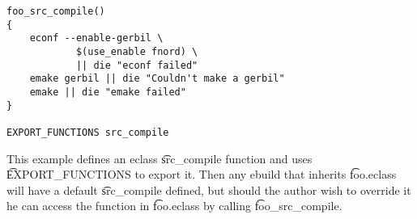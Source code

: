 \begin{lstlisting}[float,caption=EXPORT\_FUNCTIONS example: foo.eclass,label=lst:export-functions]
foo_src_compile()
{
    econf --enable-gerbil \
            $(use_enable fnord) \
            || die "econf failed"
    emake gerbil || die "Couldn't make a gerbil"
    emake || die "emake failed"
}

EXPORT_FUNCTIONS src_compile
\end{lstlisting}

This example defines an eclass \t{src\_compile} function and uses \t{EXPORT\_FUNCTIONS} to export
it. Then any ebuild that inherits \t{foo.eclass} will have a default \t{src\_compile} defined, but
should the author wish to override it he can access the function in \t{foo.eclass} by calling
\t{foo\_src\_compile}.


